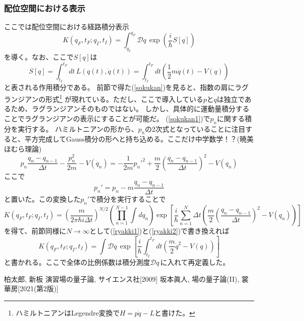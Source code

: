 \documentclass[10pt]{jsarticle}
\newcommand{\kakko}[1]{\left(#1 \right)} %
\newcommand{\kkakko}[1]{\left[ #1 \right]} %
\newcommand{\pms}[1]{\mathcal{D}#1\,}%
\numberwithin{equation}{section}%
\begin{document}
\subsubsection{配位空間における表示}
ここでは配位空間における経路積分表示
\begin{equation}
  K(q_{F},t_{F};q_{I},t_{I})=\int_{q_I}^{q_{F}} \pms{q}\exp\kakko{\frac{i}{\hbar}S[q]}
\end{equation}
を導く。なお、ここで$S[q]$は
\begin{equation}
  S[q]=\int_{t_{I}}^{t_{F}} dt \, L(q(t),\dot{q}(t))=\int_{t_{I}}^{t_{F}} dt\kakko{\frac{1}{2}m\dot{q}(t)-V(q)}
\end{equation}
と表される作用積分である。
前節で得た(\ref{sokukan})を見ると、指数の肩にラグランジアンの形式\footnote{ハミルトニアンはLegendre変換で$H=p\dot{q}-L$と書けた。}
が現れている。ただし、ここで導入している$p$と$q$は独立であるため、ラグランジアンそのものではない。
しかし、具体的に運動量積分することでラグランジアンの表示にすることが可能だ。
(\ref{sokukan1})で$p_{n}$に関する積分を実行する。
ハミルトニアンの形から、$p_{n}$の2次式となっていることに注目すると、平方完成してGauss積分の形へと持ち込める。ここだけ中学数学！？(暁美ほむら理論)
\begin{equation}
  p_{n}\frac{q_{n}-q_{n-1}}{\Delta t} - \frac{p_{n}^{2}}{2m}-V(q_{n})=-\frac{1}{2m}p_{n}'^{2}+\frac{m}{2}\kakko{\frac{q_{n}-q_{n-1}}{\Delta t}}^{2}-V(q_{n})
\end{equation}
ここで
\begin{equation}
  p_{n}'=p_{n}-m\frac{q_{n}-q_{n-1}}{\Delta t}
\end{equation}
と置いた。この変換した$p_{n}'$で積分を実行することで
\begin{equation}
  K(q_{F},t_{F};q_{I},t_{I})=\kakko{\frac{m}{2\pi\hbar i \Delta t}}^{N/2} \kakko{\prod_{n=1}^{N-1}\int dq_{n}}\exp\kkakko{\frac{i}{\hbar}\sum_{n=1}^{N}\Delta t \kakko{\frac{m}{2}\kakko{\frac{q_{n}-q_{n-1}}{\Delta t}}^{2}-V(q_{n}) }}
\end{equation}
を得て、前節同様に$N\to \infty$として(\ref{ryakki1})と(\ref{ryakki2})で書き換えれば
\begin{equation}
  K(q_{F},t_{F};q_{I},t_{I})=\int \pms{q}\exp\kkakko{\frac{i}{\hbar}\int_{t_{I}}^{t_{F}}dt\kakko{\frac{m}{2}\dot{q}^{2}-V(q) }}
\end{equation}
と書かれる。ここで全体の比例係数は積分測度$\pms{q}$に入れて再定義した。
\begin{thebibliography}{99}
   柏太郎, 新板 演習場の量子論, サイエンス社[2009]   
   坂本眞人, 場の量子論(II), 裳華房[2021(第2版)]   
\end{thebibliography}
\end{document}
